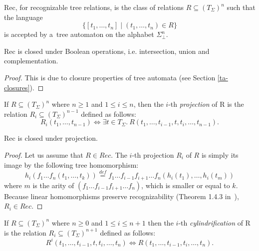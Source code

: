 \begin{defz}
Rec, for recognizable tree relations, is the class of relations $R \subseteq
(T_\Sigma)^n$ such that the language 
\begin{equation}
\{[t_1,\ldots,t_n] \mid (t_1,\ldots,t_n)
\in R\}
\end{equation} is accepted by a~tree automaton on the alphabet $\Sigma_\bot^n$.
\end{defz}

\begin{prop}
Rec is closed under Boolean operations, i.e. intersection, union and
complementation.
\end{prop}

\begin{proof}
This is due to closure properties of tree automata (see Section
\ref{ta-closures}).
\end{proof}

\begin{defz}
If $R \subseteq (T_\Sigma)^n$ where $n \geq 1$ and $1 \leq i \leq n$, then the
$i$-th \emph{projection} of R is the relation $R_i \subseteq (T_\Sigma)^{n-1}$
defined as follows: 
\begin{equation}
 R_i(t_1,\ldots,t_{n-1}) \Leftrightarrow \exists t \in T_\Sigma
.\ R(t_1,\ldots,t_{i-1},t,t_i,\ldots,t_{n-1}).
\end{equation}
\end{defz}

\begin{lemma}
Rec is closed under projection.
\end{lemma}

\begin{proof}
 Let us assume that $R \in Rec$. The $i$-th projection $R_i$ of $R$ is simply
 its image by the following tree homomorphism:
 \begin{equation}
 h_i(f_1\ldots f_n (t_1,\ldots,t_k)) \overset{\mathit{def}}{=} f_1\ldots f_{i-1}f_{i+1}\ldots f_n(h_i(t_1),\ldots,h_i(t_m))
\end{equation}
where $m$ is the arity of $(f_1\ldots f_{i-1}f_{i+1}\ldots f_n)$, which is
smaller or equal to $k$. Because linear homomorphisms preserve recognizability
(Theorem 1.4.3 in~\cite{tata}), $R_i \in Rec$.
\end{proof}

\begin{defz}
 If $R \subseteq (T_\Sigma)^n$ where $n \geq 0$ and $1 \leq i \leq n+1$ then the
 $i$-th \emph{cylindrification} of R is the relation $R_i \subseteq
 (T_\Sigma)^{n+1}$ defined as follows: 
\begin{equation}
 R^i(t_1,\ldots,t_{i-1},t,t_i,\ldots,t_n)
 \Leftrightarrow R(t_1,\ldots,t_{i-1},t_i,\ldots,t_n).
\end{equation}
\end{defz}

